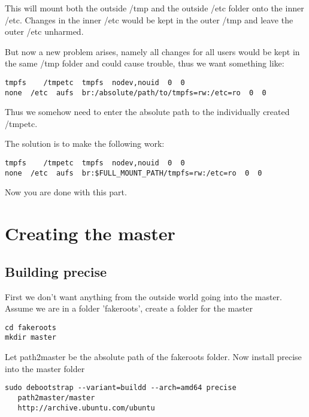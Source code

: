\documentclass[a4paper]{book}
\begin{document}
This will mount both the outside /tmp and the outside /etc folder onto the
inner /etc. Changes in the inner /etc would be kept in the outer /tmp and leave
the outer /etc unharmed.

But now a new problem arises, namely all changes for all users would be kept in
the same /tmp folder and could cause trouble, thus we want something like:

\begin{verbatim}
tmpfs    /tmpetc  tmpfs  nodev,nouid  0  0
none  /etc  aufs  br:/absolute/path/to/tmpfs=rw:/etc=ro  0  0
\end{verbatim}

Thus we somehow need to enter the absolute path to the individually created /tmpetc.

The solution is to make the following work:

\begin{verbatim}
tmpfs    /tmpetc  tmpfs  nodev,nouid  0  0
none  /etc  aufs  br:$FULL_MOUNT_PATH/tmpfs=rw:/etc=ro  0  0
\end{verbatim}


Now you are done with this part.


\section{Creating the master}
\subsection{Building precise}
First we don't want anything from the outside world going into the master.
Assume we are in a folder 'fakeroots', create a folder for the master

\begin{verbatim}
cd fakeroots
mkdir master
\end{verbatim}

Let path2master be the absolute path of the fakeroots folder.
Now install precise into the master folder

\begin{verbatim}
sudo debootstrap --variant=buildd --arch=amd64 precise 
   path2master/master 
   http://archive.ubuntu.com/ubuntu
\end{verbatim}
\end{document}
